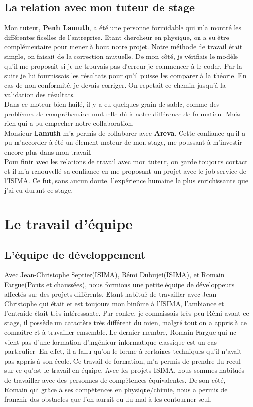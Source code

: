 \documentclass[a4paper,11pt]{article}
\begin{document}
\subsection{La relation avec mon tuteur de stage}

\normalsize{
Mon tuteur, {\bf Penh Lamuth}, a été une personne formidable qui m'a montré les différentes ficelles de l'entreprise. Etant chercheur en physique, on a su être complémentaire pour mener à bout notre projet. Notre méthode de travail était simple, on faisait de la correction mutuelle. De mon côté, je vérifiais le modèle qu'il me proposait si je ne trouvais pas d'erreur je commencer à le coder. Par la suite je lui fournissais les résultats pour qu'il puisse les comparer à la théorie. En cas de non-conformité, je devais corriger. On repetait ce chemin jusqu'à la validation des résultats. \\
Dans ce moteur bien huilé, il y a eu quelques grain de sable, comme des problèmes de compréhension mutuelle dû à notre différence de formation. Mais rien qui a pu empecher notre collaboration. \\
Monsieur {\bf Lamuth} m'a permis de collaborer avec {\bf Areva}. Cette confiance qu'il a pu m'accorder à été un élement moteur de mon stage, me poussant à m'investir encore plus dans mon travail.\\
Pour finir avec les relations de travail avec mon tuteur, on garde toujours contact et il m'a renouvellé sa confiance en me proposant un projet avec le job-service de l'ISIMA. Ce fut, sans aucun doute, l'expérience humaine la plus enrichissante que j'ai eu durant ce stage.\\
}

\section{Le travail d'équipe}

\subsection{L'équipe de développement}

\normalsize{
Avec Jean-Christophe Septier(ISIMA), Rémi Dubujet(ISIMA), et Romain Fargue(Ponts et chaussées), nous formions une petite équipe de développeurs affectés sur des projets différents. Etant habitué de travailler avec Jean-Christophe qui était et est toujours mon binôme à l'ISIMA, l'ambiance et l'entraide était très intéressante. Par contre, je connaissais très peu Rémi avant ce stage, il possède un caractère très différent du mien, malgré tout on a appris à ce connaître et à travailler emsemble. Le dernier membre, Romain Fargue qui ne vient pas d'une formation d'ingénieur informatique classique est un cas particulier. En effet, il a fallu qu'on le forme à certaines techniques qu'il n'avait pas appris à son école. Ce travail de formation, m'a permis de prendre du recul sur ce qu'est le travail en équipe. Avec les projets ISIMA, nous sommes habitués de travailler avec des personnes de compétences équivalentes. De son côté, Romain qui grâce à ses compétences en physique/chimie, nous a permis de franchir des obstacles que l'on aurait eu du mal à les contourner seul.
}
\end{document}

